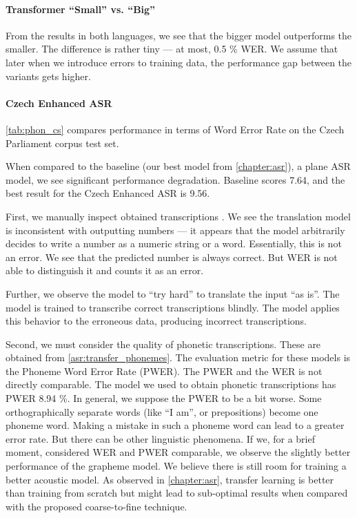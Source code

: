 \paragraph{Transformer ``Small'' vs. ``Big''} From the results in both languages, we see that the bigger model outperforms the smaller. The difference is rather tiny --- at most, 0.5 \% WER. We assume that later when we introduce errors to training data, the performance gap between the variants gets higher.

\paragraph{Czech Enhanced ASR}
\cref{tab:phon_cs} compares performance in terms of Word Error Rate on the Czech Parliament corpus test set. 

When compared to the baseline (our best model from \cref{chapter:asr}), a plane ASR model, we see significant performance degradation. Baseline scores 7.64, and the best result for the Czech Enhanced ASR is 9.56. 

First, we manually inspect obtained transcriptions . We see the translation model is inconsistent with outputting numbers --- it appears that the model arbitrarily decides to write a number as a numeric string or a word. Essentially, this is not an error. We see that the predicted number is always correct. But WER is not able to distinguish it and counts it as an error.

Further, we observe the model to ``try hard'' to translate the input ``as is''. The model is trained to transcribe correct transcriptions blindly. The model applies this behavior to the erroneous data, producing incorrect transcriptions.    

Second, we must consider the quality of phonetic transcriptions. These are obtained from \cref{asr:transfer_phonemes}. The evaluation metric for these models is the Phoneme Word Error Rate (PWER). The PWER and the WER is not directly comparable. The model we used to obtain phonetic transcriptions has PWER 8.94 \%. In general, we suppose the PWER to be a bit worse. Some orthographically separate words (like ``I am'', or prepositions) become one phoneme word. Making a mistake in such a phoneme word can lead to a greater error rate. But there can be other linguistic phenomena. If we, for a brief moment, considered WER and PWER comparable, we observe the slightly better performance of the grapheme model. We believe there is still room for training a better acoustic model. As observed in \cref{chapter:asr}, transfer learning is better than training from scratch but might lead to sub-optimal results when compared with the proposed coarse-to-fine technique. 

